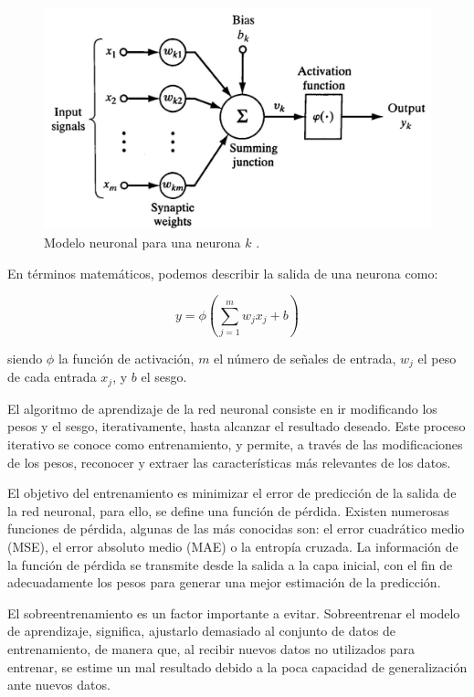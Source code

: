 \begin{figure}[h]
	\centering
	\includegraphics[scale=0.25]{imagenes/cap2/neuron-model.png}
	\caption{Modelo neuronal para una neurona $k$ \cite{25}.}
	\label{fig4}
\end{figure}

En términos matemáticos, podemos describir la salida de una neurona como:

\begin{equation}
	y = \phi(\sum_{j=1}^{m} w_j x_j + b)
\end{equation}

siendo $\phi$ la función de activación, $m$ el número de señales de entrada, $w_j$ el peso de cada entrada $x_j$, y $b$ el sesgo.

El algoritmo de aprendizaje de la red neuronal consiste en ir modificando los pesos y el sesgo, iterativamente, hasta alcanzar el resultado deseado. Este proceso iterativo se conoce como entrenamiento, y permite, a través de las modificaciones de los pesos, reconocer y extraer las características más relevantes de los datos.

El objetivo del entrenamiento es minimizar el error de predicción de la salida de la red neuronal, para ello, se define una función de pérdida. Existen numerosas funciones de pérdida, algunas de las más conocidas son: el error cuadrático medio (MSE), el error absoluto medio (MAE) o la entropía cruzada. La información de la función de pérdida se transmite desde la salida a la capa inicial, con el fin de adecuadamente los pesos para generar una mejor estimación de la predicción.

El sobreentrenamiento es un factor importante a evitar. Sobreentrenar el modelo de aprendizaje, significa, ajustarlo demasiado al conjunto de datos de entrenamiento, de manera que, al recibir nuevos datos no utilizados para entrenar, se estime un mal resultado debido a la poca capacidad de generalización ante nuevos datos.



